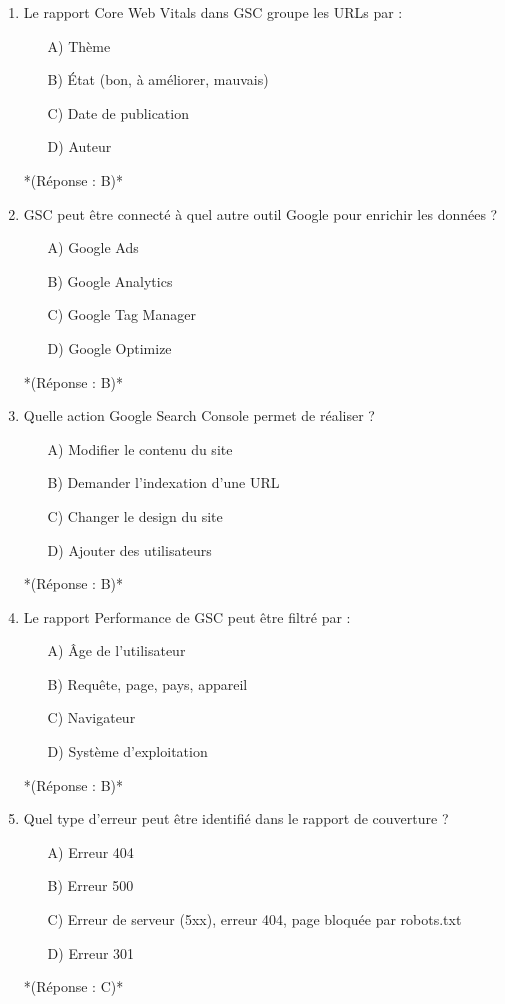 \documentclass[12pt,a4paper,twoside]{report}
\begin{document}
\begin{enumerate}
    \item Le rapport Core Web Vitals dans GSC groupe les URLs par :
    \begin{itemize}
        \item[A)] Thème
        \item[B)] État (bon, à améliorer, mauvais)
        \item[C)] Date de publication
        \item[D)] Auteur
    \end{itemize}
    *(Réponse : B)*

    \item GSC peut être connecté à quel autre outil Google pour enrichir les données ?
    \begin{itemize}
        \item[A)] Google Ads
        \item[B)] Google Analytics
        \item[C)] Google Tag Manager
        \item[D)] Google Optimize
    \end{itemize}
    *(Réponse : B)*

    \item Quelle action Google Search Console permet de réaliser ?
    \begin{itemize}
        \item[A)] Modifier le contenu du site
        \item[B)] Demander l'indexation d'une URL
        \item[C)] Changer le design du site
        \item[D)] Ajouter des utilisateurs
    \end{itemize}
    *(Réponse : B)*

    \item Le rapport Performance de GSC peut être filtré par :
    \begin{itemize}
        \item[A)] Âge de l'utilisateur
        \item[B)] Requête, page, pays, appareil
        \item[C)] Navigateur
        \item[D)] Système d'exploitation
    \end{itemize}
    *(Réponse : B)*

    \item Quel type d'erreur peut être identifié dans le rapport de couverture ?
    \begin{itemize}
        \item[A)] Erreur 404
        \item[B)] Erreur 500
        \item[C)] Erreur de serveur (5xx), erreur 404, page bloquée par robots.txt
        \item[D)] Erreur 301
    \end{itemize}
    *(Réponse : C)*


\end{enumerate}
\end{document}
